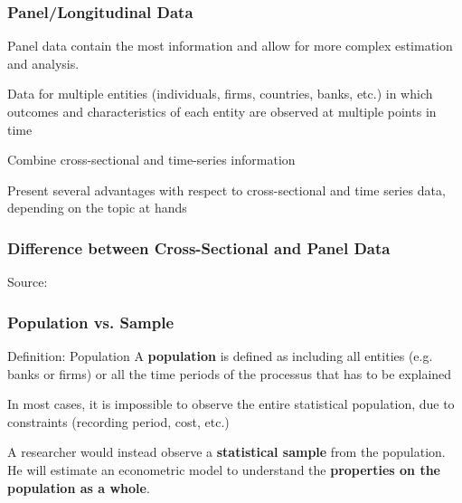 \documentclass{beamer}
\newenvironment{wideitemize}{\itemize\addtolength{\itemsep}{10pt}}{\enditemize}
\begin{document}
\begin{frame}
  \frametitle{Panel/Longitudinal Data}
  Panel data contain the most information and allow for more complex estimation and analysis.\\

  \medskip

  \begin{wideitemize}
    \item Data for multiple entities (individuals, firms, countries, banks, etc.) in which outcomes and characteristics of each entity are observed at multiple points in time
    \item Combine cross-sectional and time-series information
    \item Present several advantages with respect to cross-sectional and time series data, depending on the topic at hands
  \end{wideitemize}
\end{frame}

\begin{frame}
  \frametitle{Difference between Cross-Sectional and Panel Data}
  \hspace*{15pt}\hbox{\scriptsize Source:}
\end{frame}


\begin{frame}
  \frametitle{Population vs. Sample}

  \begin{block}{Definition: Population}
    A \textbf{population} is defined as including all entities (e.g. banks or firms) or all the time periods of the processus that has to be explained
  \end{block}

\smallskip
  
  \begin{wideitemize}
    \item In most cases, it is impossible to observe the entire statistical population, due to constraints (recording period, cost, etc.)
    \item A researcher would instead observe a \textbf{statistical sample} from the population. He will estimate an econometric model to understand the \textbf{properties on the population as a whole}.
  \end{wideitemize} 
\end{frame}
\end{document}
